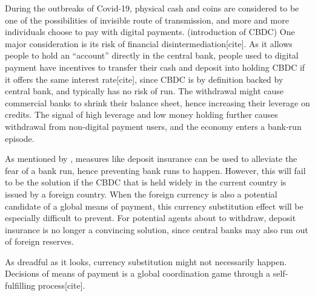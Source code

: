 During the outbreaks of Covid-19, physical cash and coins are considered to be
one of the possibilities of invisible route of transmission, and more and more
individuals choose to pay with digital payments. 
(introduction of CBDC)
One major consideration is its risk of financial disintermediation[cite].  As it
allows people to hold an ``account'' directly in the central bank, people used
to digital payment have incentives to transfer their cash and deposit into
holding CBDC if it offers the same interest rate[cite], since CBDC is by
definition backed by central bank, and typically has no risk of run. The
withdrawal might cause commercial banks to shrink their balance sheet, hence
increasing their leverage on credits.  The signal of high leverage and low money
holding further causes withdrawal from non-digital payment users, and the
economy enters a bank-run episode. 

As mentioned by \citet*{DD83}, measures like deposit insurance can be used to
alleviate the fear of a bank run, hence preventing bank runs to happen. However,
this will fail to be the solution if the CBDC that is held widely in the current
country is issued by a foreign country. When the foreign currency is also a
potential candidate of a global means of payment, this currency substitution
effect will be especially difficult to prevent. For potential agents about to withdraw, deposit insurance is no longer a
convincing solution, since central banks may also run out of foreign reserves. 

As dreadful as it looks, currency substitution might not necessarily happen.
Decisions of means of payment is a global coordination game through a
self-fulfilling process[cite]. 